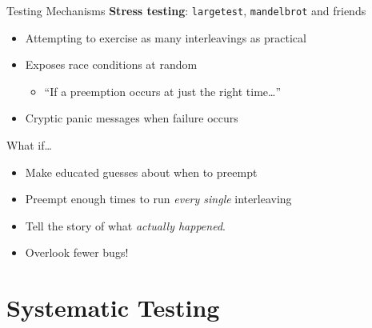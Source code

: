 \documentclass[xcolor=dvipsnames]{beamer}
\begin{document}
\begin{frame}{Testing Mechanisms}
	\textbf{Stress testing}: \texttt{largetest}, \texttt{mandelbrot} and friends
	\begin{itemize}
		\item Attempting to exercise as many interleavings as practical
		\item Exposes race conditions at random
		\begin{itemize}
			\item ``If a preemption occurs at just the right time\ldots''
		\end{itemize}
		\item Cryptic panic messages when failure occurs
	\end{itemize}
	\linegap
	What if\ldots
	\begin{itemize}
		\item Make educated guesses about when to preempt
		\item Preempt enough times to run {\em every single} interleaving
		\item Tell the story of what {\em actually happened}.
		\item Overlook fewer bugs!
	\end{itemize}
\end{frame}


\section{Systematic Testing}

\end{document}
